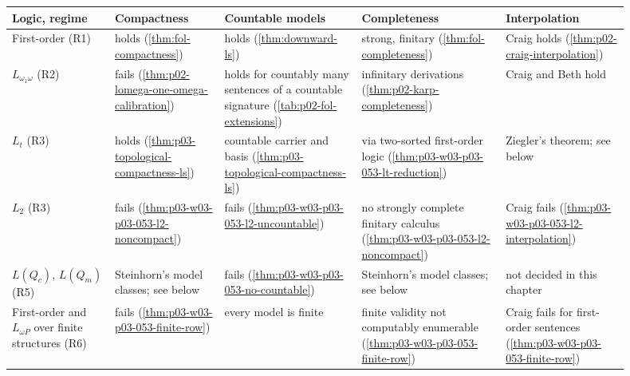 \begin{center}
\footnotesize
\begin{tabular}{@{}p{0.15\linewidth}p{0.16\linewidth}p{0.2\linewidth}p{0.21\linewidth}p{0.18\linewidth}@{}}
\hline
Logic, regime & Compactness & Countable models & Completeness & Interpolation \\
\hline
First-order (R1) & holds (\cref{thm:fol-compactness}) &
  holds (\cref{thm:downward-ls}) &
  strong, finitary (\cref{thm:fol-completeness}) &
  Craig holds (\cref{thm:p02-craig-interpolation}) \\
\(L_{\omega_1\omega}\) (R2) & fails
  (\cref{thm:p02-lomega-one-omega-calibration}) &
  holds for countably many sentences of a countable signature
  (\cref{tab:p02-fol-extensions}) &
  infinitary derivations (\cref{thm:p02-karp-completeness}) &
  Craig and Beth hold \cite[\S1.6, p.~10]{Barwise1985BackgroundAims} \\
\(L_t\) (R3) & holds (\cref{thm:p03-topological-compactness-ls}) &
  countable carrier and basis (\cref{thm:p03-topological-compactness-ls}) &
  via two-sorted first-order logic (\cref{thm:p03-w03-p03-053-lt-reduction}) &
  Ziegler's theorem; see below \\
\(L_2\) (R3) & fails (\cref{thm:p03-w03-p03-053-l2-noncompact}) &
  fails (\cref{thm:p03-w03-p03-053-l2-uncountable}) &
  no strongly complete finitary calculus (\cref{thm:p03-w03-p03-053-l2-noncompact}) &
  Craig fails (\cref{thm:p03-w03-p03-053-l2-interpolation}) \\
\(L(Q_c)\), \(L(Q_m)\) (R5) & Steinhorn's model classes; see below &
  fails (\cref{thm:p03-w03-p03-053-no-countable}) &
  Steinhorn's model classes; see below &
  not decided in this chapter \\
First-order and \(L_{\omega P}\) over finite structures (R6) &
  fails (\cref{thm:p03-w03-p03-053-finite-row}) &
  every model is finite &
  finite validity not computably enumerable
  (\cref{thm:p03-w03-p03-053-finite-row}) &
  Craig fails for first-order sentences
  (\cref{thm:p03-w03-p03-053-finite-row}) \\
\hline
\end{tabular}
\end{center}

